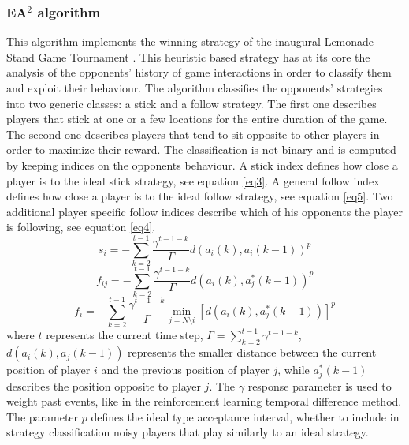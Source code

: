\documentclass[runningheads]{llncs}
\begin{document}
\subsubsection{EA$^2$ algorithm}
This algorithm implements the winning strategy of the inaugural
Lemonade Stand Game Tournament \cite{ea2}. This heuristic based
strategy has at its core the analysis of the opponents' history of
game interactions in order to classify them and exploit their
behaviour. The algorithm classifies the opponents' strategies into two
generic classes: a stick and a follow strategy. The first one
describes players that stick at one or a few locations for the entire
duration of the game. The second one describes players that tend to
sit opposite to other players in order to maximize their reward. The
classification is not binary and is computed by keeping indices on the
opponents behaviour. A stick index defines how close a player is to the
ideal stick strategy, see equation \ref{eq3}. A general follow index
defines how close a player is to the ideal follow strategy, see equation \ref{eq5}. Two
additional player specific follow indices describe which of his
opponents the player is following, see equation \ref{eq4}.
\begin{equation}\label{eq3}
  s_i = - \sum_{k = 2}^{t-1}\frac{\gamma^{t-1-k}}{\Gamma}d(a_i(k), a_i(k-1))^p
\end{equation}
\begin{equation}\label{eq4}
f_{ij} = - \sum_{k = 2}^{t-1}\frac{\gamma^{t-1-k}}{\Gamma}d(a_i(k), a_j^*(k-1))^p
\end{equation}
\begin{equation}\label{eq5}
f_{i} = - \sum_{k = 2}^{t-1}\frac{\gamma^{t-1-k}}{\Gamma}\min_{j = N \setminus i}[d(a_i(k), a_j^*(k-1))]^p
\end{equation}
where $t$ represents the current time step, $\Gamma = \sum_{k =
  2}^{t-1}\gamma^{t-1-k}$, $d(a_i(k), a_j(k-1))$ represents the
smaller distance between the current position of player $i$ and
the previous position of player $j$, while $a_j^*(k-1)$ describes the
position opposite to player $j$. The $\gamma$ response parameter is
used to weight past events, like in the reinforcement learning
temporal difference method. The parameter $p$ defines the ideal type
acceptance interval, whether to include in strategy classification noisy players
that play similarly to an ideal strategy.
\end{document}
